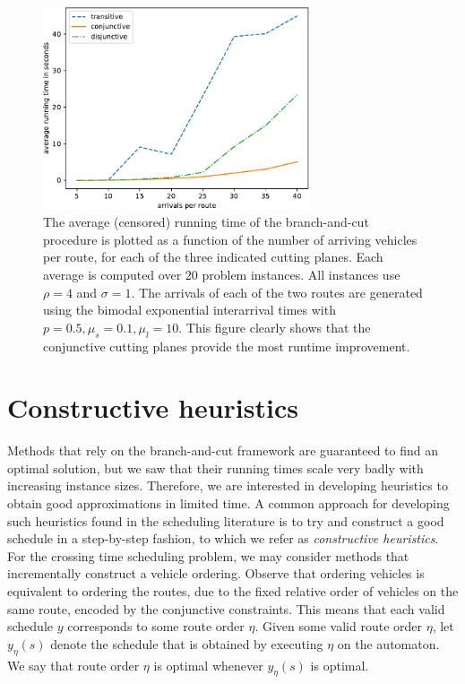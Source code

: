 \documentclass[a4paper]{article}
\theoremstyle{definition}
\theoremstyle{plain}
\begin{document}
\begin{figure}
  \centering
  \includegraphics[width=0.7\textwidth]{data-single/running_times.pdf}
  \caption{The average (censored) running time of the branch-and-cut procedure
    is plotted as a function of the number of arriving vehicles per route, for
    each of the three indicated cutting planes. Each average is computed over
    $20$ problem instances. All instances use $\rho = 4$ and $\sigma = 1$. The arrivals
    of each of the two routes are generated using the bimodal exponential
    interarrival times with $p=0.5, \mu_{s} = 0.1, \mu_{l} = 10$. This figure
    clearly shows that the conjunctive cutting planes provide the most runtime
    improvement.}
  \label{fig:running_time}
\end{figure}


\section{Constructive heuristics}

Methods that rely on the branch-and-cut framework are guaranteed to find an
optimal solution, but we saw that their running times scale very badly with
increasing instance sizes. Therefore, we are interested in developing heuristics
to obtain good approximations in limited time. A common approach for developing
such heuristics found in the scheduling literature is to try and construct a
good schedule in a step-by-step fashion, to which we refer as
\textit{constructive heuristics}. For the crossing time scheduling problem, we
may consider methods that incrementally construct a vehicle ordering.
%
Observe that ordering vehicles is equivalent to ordering the routes, due to the
fixed relative order of vehicles on the same route, encoded by the conjunctive
constraints. This means that each valid schedule $y$ corresponds to some route
order $\eta$.
Given some valid route order $\eta$, let $y_{\eta}(s)$ denote the schedule that is
obtained by executing $\eta$ on the automaton. We say that route order $\eta$ is
optimal whenever $y_{\eta}(s)$ is optimal.
\end{document}
